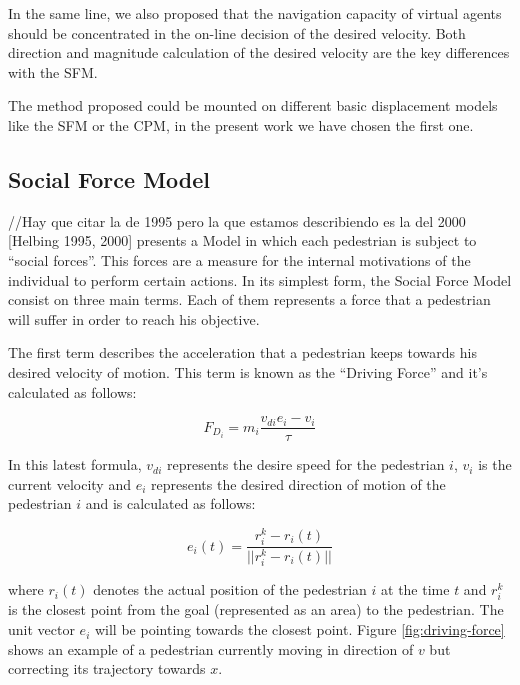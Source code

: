 \documentclass[english]{article}
\numberwithin{equation}{section}
\numberwithin{figure}{section}
\begin{document}
In the same line, we also proposed that the navigation capacity of
virtual agents should be concentrated in the on-line decision of the
desired velocity. Both direction and magnitude calculation of the desired velocity
are the key differences with the SFM.

The method proposed could be mounted on different basic displacement
models like the SFM or the CPM, in the present work we have chosen
the first one.


\subsection{Social Force Model}

//Hay que citar la de 1995 pero la que estamos describiendo es la del 2000
{[}Helbing 1995, 2000{]} presents a Model in which each pedestrian
is subject to ``social forces''. This forces are a measure for the
internal motivations of the individual to perform certain actions.
In its simplest form, the Social Force Model consist on three main
terms. Each of them represents a force that a pedestrian will
suffer in order to reach his objective.

The first term describes the acceleration that a pedestrian keeps
towards his desired velocity of motion. This term is known as the
``Driving Force'' and it's calculated as follows:

\begin{equation}
\label{eq:driving-force}
F_{D_{i}}=m_{i}\frac{v_{di}e_{i}-v_{i}}{\tau}
\end{equation}


In this latest formula, $v_{di}$ represents the desire speed for
the pedestrian $i$, $v_{i}$ is the current velocity and $e_{i}$
represents the desired direction of motion of the pedestrian $i$
and is calculated as follows:

\begin{equation}
\label{eq:desired-direction}
e_{i}(t)=\frac{r_{i}^{k}-r_{i}(t)}{||r_{i}^{k}-r_{i}(t)||}
\end{equation}

where $r_{i}(t)$ denotes the actual position of the pedestrian
$i$ at the time $t$ and $r_{i}^{k}$ is the closest point from the goal
(represented as an area) to the pedestrian. The unit vector $e_{i}$ will 
be pointing towards the closest point. Figure \ref{fig:driving-force} shows an 
example of a pedestrian currently moving in direction of $v$ but correcting its 
trajectory towards $x$.
\end{document}
